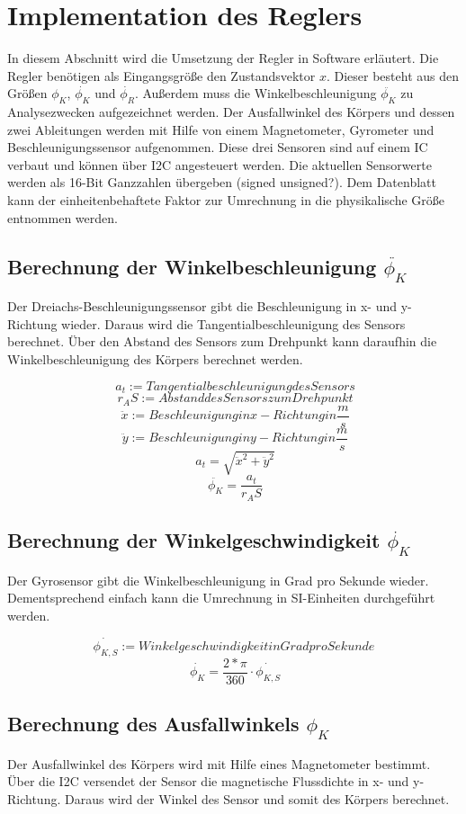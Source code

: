 \documentclass{article}
\begin{document}
\section{Implementation des Reglers}
In diesem Abschnitt wird die Umsetzung der Regler in Software erläutert. Die Regler benötigen als Eingangsgröße den Zustandsvektor $x$. Dieser besteht aus den Größen $\phi_K$, $\dot{\phi_K}$ und $\dot{\phi_R}$. Außerdem muss die Winkelbeschleunigung $\ddot{\phi_K}$ zu Analysezwecken aufgezeichnet werden. Der Ausfallwinkel des Körpers und dessen zwei Ableitungen werden mit Hilfe von einem Magnetometer, Gyrometer und Beschleunigungssensor aufgenommen. Diese drei Sensoren sind auf einem IC verbaut und können über I2C angesteuert werden. Die aktuellen Sensorwerte werden als 16-Bit Ganzzahlen übergeben (signed unsigned?). Dem Datenblatt kann der einheitenbehaftete Faktor zur Umrechnung in die physikalische Größe entnommen werden.

\subsection{Berechnung der Winkelbeschleunigung $\ddot{\phi_K}$}
Der Dreiachs-Beschleunigungssensor gibt die Beschleunigung in x- und y-Richtung wieder. Daraus wird die Tangentialbeschleunigung des Sensors berechnet. Über den Abstand des Sensors zum Drehpunkt kann daraufhin die Winkelbeschleunigung des Körpers berechnet werden.

\[\ a_t := Tangentialbeschleunigung des Sensors \]
\[\ r_AS := Abstand des Sensors zum Drehpunkt \]
\[\ \ddot{x} := Beschleunigung in x-Richtung in \frac{m}{s} \]
\[\ \ddot{y} := Beschleunigung in y-Richtung in \frac{m}{s} \]
\[\ a_t = \sqrt{\ddot{x}^2 + \ddot{y}^2} \]
\[\ \ddot{\phi_K} = \frac{a_t}{r_AS} \] 

\subsection{Berechnung der Winkelgeschwindigkeit $\dot{\phi_K}$}
Der Gyrosensor gibt die Winkelbeschleunigung in Grad pro Sekunde wieder. Dementsprechend einfach kann die Umrechnung in SI-Einheiten durchgeführt werden.

\[ \dot{\phi_{K,S}} := Winkelgeschwindigkeit in Grad pro Sekunde \]
\[\ \dot{\phi_K} = \frac{2*\pi}{360} \cdot \dot{\phi_{K,S}} \]

\subsection{Berechnung des Ausfallwinkels $\phi_K$}
Der Ausfallwinkel des Körpers wird mit Hilfe eines Magnetometer bestimmt. Über die I2C versendet der Sensor die magnetische Flussdichte in x- und y-Richtung. Daraus wird der Winkel des Sensor und somit des Körpers berechnet.
\end{document}
